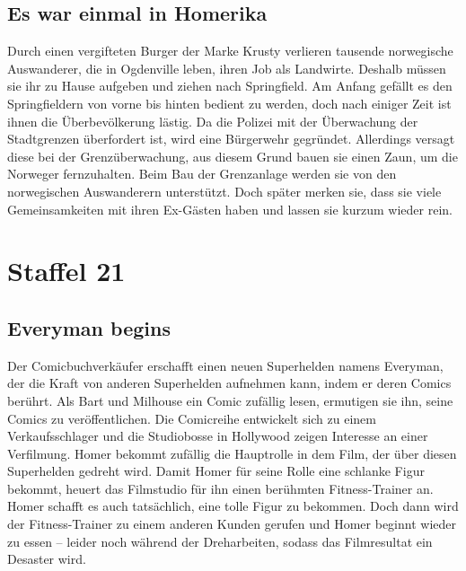 \subsection{Es war einmal in Homerika}
Durch einen vergifteten Burger der Marke Krusty verlieren tausende norwegische Auswanderer, die in Ogdenville leben, ihren Job als Landwirte. Deshalb müssen sie ihr zu Hause aufgeben und ziehen nach Springfield. Am Anfang gefällt es den Springfieldern von vorne bis hinten bedient zu werden, doch nach einiger Zeit ist ihnen die Überbevölkerung lästig. Da die Polizei mit der Überwachung der Stadtgrenzen überfordert ist, wird eine Bürgerwehr gegründet. Allerdings versagt diese bei der Grenzüberwachung, aus diesem Grund bauen sie einen Zaun, um die Norweger fernzuhalten. Beim Bau der Grenzanlage werden sie von den norwegischen Auswanderern unterstützt. Doch später merken sie, dass sie viele Gemeinsamkeiten mit ihren Ex-Gästen haben und lassen sie kurzum wieder rein. 


\section{Staffel 21}

\subsection{Everyman begins}\label{LABF13}
Der Comicbuchverkäufer erschafft einen neuen Superhelden namens Everyman, der die Kraft von anderen Superhelden aufnehmen kann, indem er deren Comics berührt. Als Bart und Milhouse ein Comic zufällig lesen, ermutigen sie ihn, seine Comics zu veröffentlichen. Die Comicreihe entwickelt sich zu einem Verkaufsschlager und die Studiobosse in Hollywood zeigen Interesse an einer Verfilmung.  Homer bekommt zufällig die Hauptrolle in dem Film, der über diesen Superhelden gedreht wird. Damit Homer für seine Rolle eine schlanke Figur bekommt, heuert das Filmstudio für ihn einen berühmten Fitness-Trainer an. Homer schafft es auch tatsächlich, eine tolle Figur zu bekommen. Doch dann wird der Fitness-Trainer zu einem anderen Kunden gerufen und Homer beginnt wieder zu essen -- leider noch während der Dreharbeiten, sodass das Filmresultat ein Desaster wird.

